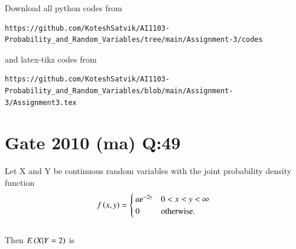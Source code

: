 \documentclass[journal,12pt,twocolumn]{IEEEtran}
\begin{document}
\author{Songa Kotesh Satvik}
\maketitle
\newpage
\bigskip
\renewcommand{\thefigure}{\theenumi}
\renewcommand{\thetable}{\theenumi}
Download all python codes from 
\begin{lstlisting}
https://github.com/KoteshSatvik/AI1103-Probability_and_Random_Variables/tree/main/Assignment-3/codes
\end{lstlisting}
%
and latex-tikz codes from 
%
\begin{lstlisting}
https://github.com/KoteshSatvik/AI1103-Probability_and_Random_Variables/blob/main/Assignment-3/Assignment3.tex
\end{lstlisting}
\section{\textbf{Gate 2010 (ma) Q:}49}
Let X and Y be continuous random variables with the joint probability density function 
\begin{align}
f\left(x,y\right)= 
\begin{cases}
ae^{-2y} & 0<x<y<\infty \\
0 & \text{otherwise}.
\end{cases}   
\end{align}
\\Then $E\left(X|Y=2\right)$ is 
\end{document}

